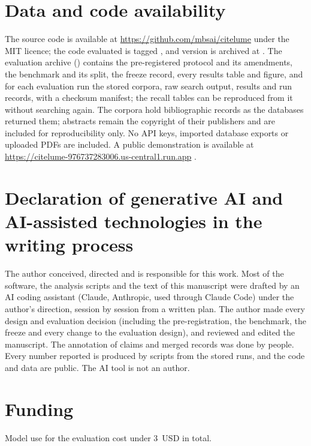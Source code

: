\section*{Data and code availability}
\label{sec:availability}

The source code is available at \url{https://github.com/mbsai/citelume} under the MIT licence; the code evaluated is
tagged , and version  is archived at . The evaluation archive
() contains the pre-registered protocol and its amendments, the benchmark and its split, the freeze
record, every results table and figure, and for each evaluation run the stored corpora, raw search output, results
and run records, with a checksum manifest; the recall tables can be reproduced from it without searching again. The
corpora hold bibliographic records as the databases returned them; abstracts remain the copyright of their
publishers and are included for reproducibility only. No API keys, imported database exports or uploaded PDFs are
included. A public demonstration is available at \url{https://citelume-976737283006.us-central1.run.app}
.

\section*{Declaration of generative AI and AI-assisted technologies in the writing process}
\label{sec:ai}

 The author conceived,
directed and is responsible for this work. Most of the software, the analysis scripts and the text of this
manuscript were drafted by an AI coding assistant (Claude, Anthropic, used through Claude Code) under the author's
direction, session by session from a written plan. The author made every design and evaluation decision (including
the pre-registration, the benchmark, the freeze and every change to the evaluation design), and reviewed and edited
the manuscript. The annotation of claims and merged records was done by people. Every number reported is produced
by scripts from the stored runs, and the code and data are public. The AI tool is not an author.

\section*{Funding}
 Model use for the evaluation cost under 3~USD in total.

